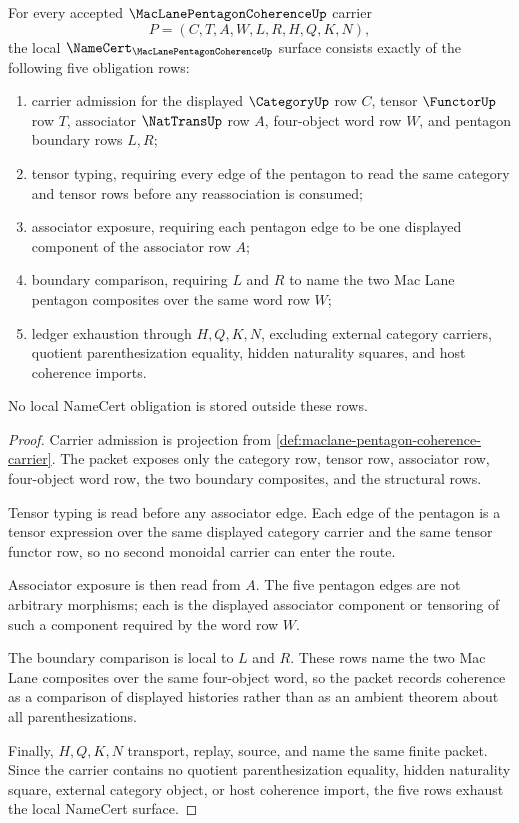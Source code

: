 \begin{theorem}
\label{thm:maclane-pentagon-coherence-namecert-obligations}
For every accepted $\MacLanePentagonCoherenceUp$ carrier
$$
P=(C,T,A,W,L,R,H,Q,K,N),
$$
the local $\NameCert_{\MacLanePentagonCoherenceUp}$ surface consists exactly of the following five obligation rows:
\begin{enumerate}
\item carrier admission for the displayed $\CategoryUp$ row $C$, tensor $\FunctorUp$ row $T$, associator $\NatTransUp$ row $A$, four-object word row $W$, and pentagon boundary rows $L,R$;
\item tensor typing, requiring every edge of the pentagon to read the same category and tensor rows before any reassociation is consumed;
\item associator exposure, requiring each pentagon edge to be one displayed component of the associator row $A$;
\item boundary comparison, requiring $L$ and $R$ to name the two Mac Lane pentagon composites over the same word row $W$;
\item ledger exhaustion through $H,Q,K,N$, excluding external category carriers, quotient parenthesization equality, hidden naturality squares, and host coherence imports.
\end{enumerate}
No local NameCert obligation is stored outside these rows.
\end{theorem}
\begin{proof}
Carrier admission is projection from \autoref{def:maclane-pentagon-coherence-carrier}. The packet exposes only the category row, tensor row, associator row, four-object word row, the two boundary composites, and the structural rows.

Tensor typing is read before any associator edge. Each edge of the pentagon is a tensor expression over the same displayed category carrier and the same tensor functor row, so no second monoidal carrier can enter the route.

Associator exposure is then read from $A$. The five pentagon edges are not arbitrary morphisms; each is the displayed associator component or tensoring of such a component required by the word row $W$.

The boundary comparison is local to $L$ and $R$. These rows name the two Mac Lane composites over the same four-object word, so the packet records coherence as a comparison of displayed histories rather than as an ambient theorem about all parenthesizations.

Finally, $H,Q,K,N$ transport, replay, source, and name the same finite packet. Since the carrier contains no quotient parenthesization equality, hidden naturality square, external category object, or host coherence import, the five rows exhaust the local NameCert surface.
\end{proof}

